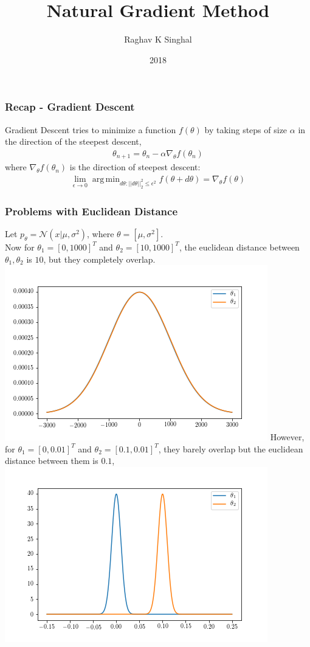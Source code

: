 \documentclass[hyperref={pdfpagelabels=false}]{beamer}
\title{Natural Gradient Method}
\author{Raghav K Singhal}
\institute{NYU Courant}
\date{2018}
\DeclareMathOperator*{\argmin}{arg\,min}
\begin{document}
\frame{\titlepage}

\begin{frame}
\frametitle{Recap - Gradient Descent}
Gradient Descent tries to minimize a function $f(\theta)$ by taking steps of size $\alpha$ in the direction of the steepest descent,
\begin{align*}
\theta_{n+1} = \theta_{n} - \alpha \nabla_{\theta} f(\theta_{n})
\end{align*}
where $\nabla_{\theta} f(\theta_{n})$ is the direction of steepest descent:
\begin{align*}
\lim_{\epsilon \rightarrow 0} \argmin_{d\theta: || d\theta ||_2^2 \leq \epsilon^2 } f( \theta + d\theta) = \nabla_{\theta} f(\theta)
\end{align*}
\end{frame}

\begin{frame}
\frametitle{Problems with Euclidean Distance}

Let $p_{\theta} = \mathcal{N}(x | \mu, \sigma^2)$, where $\theta = [\mu, \sigma^2]$.
\\
Now for $\theta_1 = [0, 1000]^T$ and $\theta_2 = [10, 1000]^T$, the euclidean distance between $\theta_1, \theta_2$ is $10$, but they completely overlap.
\\
\includegraphics[scale=0.3]{experiment_1.png}
However, for $\theta_1 = [0, 0.01]^T$ and $\theta_2 = [0.1, 0.01]^T$, they barely overlap but the euclidean distance between them is $0.1$,
\\
\includegraphics[scale=0.3]{experiment_2.png}
\end{frame}
\end{document}
